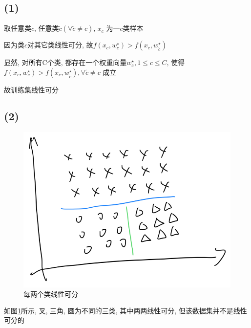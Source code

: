 \documentclass[../main.tex]{subfiles}
\begin{document}
\subsection*{(1)}

取任意类$c$,
任意类$\tilde{c} (\forall \tilde{c} \ne c)$,
$x_c$ 为一$c$类样本

因为类$c$对其它类线性可分,
故$f(x_c, w_c^\star) > f(x_c, w_{\tilde{c}}^\star)$

显然, 对所有C个类, 都存在一个权重向量$w_c^\star, 1 \le c \le C$,
使得
$f(x_c, w_c^\star) > f(x_c, w_{\tilde{c}}^\star), \forall \tilde{c} \ne c$
成立

故训练集线性可分

\subsection*{(2)}

\begin{figure}
    \centering
    \includegraphics[width=.6\textwidth]{../figure/3-5.png}
    \caption{每两个类线性可分}
    \label{img3-5}
\end{figure}

如图\ref*{img3-5}所示,
叉, 三角, 圆为不同的三类, 其中两两线性可分,
但该数据集并不是线性可分的
\end{document}
